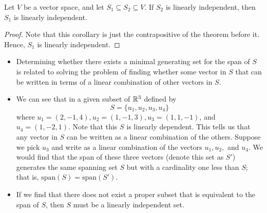 \begin{corollary}
   Let \( V  \) be a vector space, and let \( S_{1} \subseteq S_{2} \subseteq V  \). If \( S_{2}  \) is linearly independent, then \( S_{1}  \) is linearly independent. 
\end{corollary}
\begin{proof}
    Note that this corollary is just the contrapositive of the theorem before it. Hence, \( S_{1}  \) is linearly independent.
\end{proof}

\begin{itemize}
    \item Determining whether there exists a minimal generating set for the span of \( S  \) is related to solving the problem of finding whether some vector in \( S  \) that can be written in terms of a linear combination of other vectors in \( S  \). 
    \item We can see that in a given subset of \( \mathbb{R}^{3}  \) defined by 
        \[  S = \{ u_{1}, u_{2}, u_{3}, u_{4}  \}  \] where \( u_{1} = (2,-1,4) , u_{2} = (1,-1, 3), u_{3} = (1,1,-1) \), and \( u_{4} = (1,-2,1) \). Note that this \( S  \) is linearly dependent. This tells us that any vector in \( S  \) can be written as a linear combination of the others. Suppose we pick \( u_{3}  \) and write as a linear combination of the vectors \( u_{1}, u_{2},  \) and \( u_{4} \). We would find that the span of these three vectors (denote this set as \( S' \)) generates the same spanning set \( S  \) but with a cardinality one less than \( S  \); that is, \( \text{span}(S) = \text{span}(S') \). 
    \item If we find that there does not exist a proper subset that is equivalent to the span of \( S  \), then \( S  \) must be a linearly independent set.
\end{itemize}

